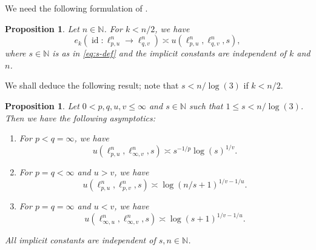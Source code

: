 \documentclass[a4paper,12pt]{article}
\newtheorem{prop}[thm]{Proposition}
\theoremstyle{definition}
\newcommand{\N}{\mathbb{N}}
\newcommand{\IN}{\mathbb{N}}
\DeclareMathOperator{\id}{id}
\begin{document}
We need the following formulation of \cite[Section 4, Theorem 2]{EN98}.

\begin{prop}\label{pro:edmunds-netrusov}
Let $n\in\N$. For $k<n/2$, we have
\[
e_k(\id\colon \ell_{p,u}^n\to \ell_{q,v}^n)
\asymp u(\ell_{p,u}^n,\ell_{q,v}^n,s),
\]
where $s\in\IN$ is as in \eqref{eq:s-def} and the implicit constants are independent of $k$ and $n$. 
\end{prop}

We shall deduce the following result; note that $s<n/\log(3)$ if $k<n/2$.
\begin{prop}\label{pro:truncation}
Let $0<p,q,u,v\le \infty$ and $s\in\N$ such that $1\le s<n/\log(3)$. Then we have the following asymptotics:
\begin{enumerate}
\item[\emph{(II)}] For $p<q=\infty$, we have 
\[
u(\ell_{p,u}^n,\ell_{\infty,v}^n,s)\asymp s^{-1/p}\log(s)^{1/v}.
\]
\item[\emph{(III.2)}] For $p=q<\infty$ and $u>v$, we have 
\[
u(\ell_{p,u}^n,\ell_{p,v}^n,s)\asymp \log(n/s+1)^{1/v-1/u}.
\]
\item[\emph{(IV.2)}] For $p=q=\infty$ and $u< v$, we have 
\[
u(\ell_{\infty,u}^n,\ell_{\infty,v}^n,s)\asymp \log(s+1)^{1/v-1/u}.
\]
\end{enumerate}
All implicit constants are independent of $s,n\in\IN$. 
\end{prop}
\end{document}
